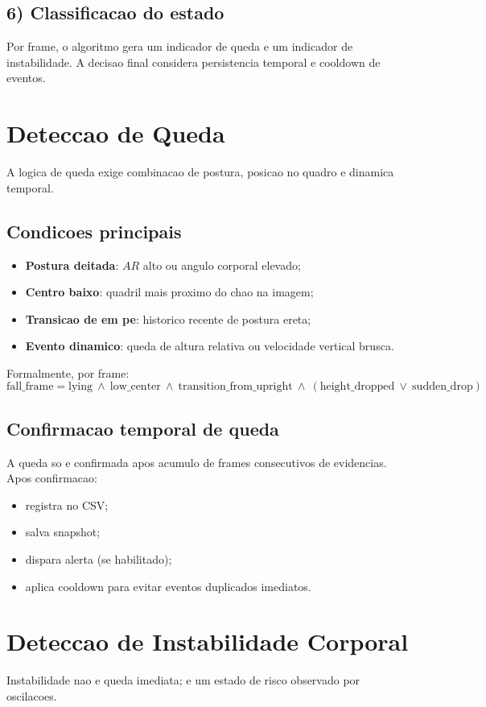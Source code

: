 \documentclass[12pt,a4paper]{article}
\begin{document}
\subsection{6) Classificacao do estado}
Por frame, o algoritmo gera um indicador de queda e um indicador de instabilidade.
A decisao final considera persistencia temporal e cooldown de eventos.

\section{Deteccao de Queda}
A logica de queda exige combinacao de postura, posicao no quadro e dinamica temporal.

\subsection{Condicoes principais}
\begin{itemize}
    \item \textbf{Postura deitada}: $AR$ alto ou angulo corporal elevado;
    \item \textbf{Centro baixo}: quadril mais proximo do chao na imagem;
    \item \textbf{Transicao de em pe}: historico recente de postura ereta;
    \item \textbf{Evento dinamico}: queda de altura relativa ou velocidade vertical brusca.
\end{itemize}

Formalmente, por frame:
\[
\text{fall\_frame} = \text{lying}\ \land\ \text{low\_center}\ \land\ \text{transition\_from\_upright}\ \land\ (\text{height\_dropped}\ \lor\ \text{sudden\_drop})
\]

\subsection{Confirmacao temporal de queda}
A queda so e confirmada apos acumulo de frames consecutivos de evidencias.
Apos confirmacao:
\begin{itemize}
    \item registra no CSV;
    \item salva snapshot;
    \item dispara alerta (se habilitado);
    \item aplica cooldown para evitar eventos duplicados imediatos.
\end{itemize}

\section{Deteccao de Instabilidade Corporal}
Instabilidade nao e queda imediata; e um estado de risco observado por oscilacoes.
\end{document}
